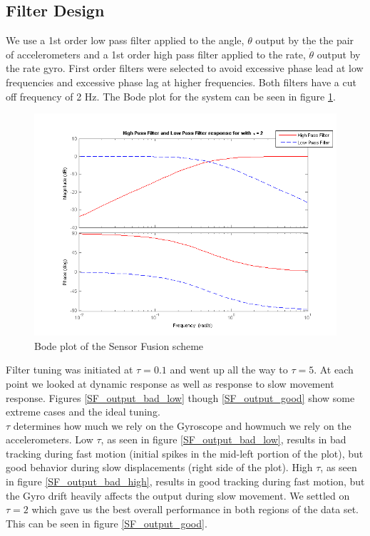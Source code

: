 \documentclass{article}
\theoremstyle{plain}
\theoremstyle{definition}
\theoremstyle{remark}
\begin{document}
\subsection{Filter Design}

We use a 1st order low pass filter applied to the angle, $\theta$ output by the the pair of accelerometers and a 1st order high pass filter applied to the rate, $\dot{\theta}$ output by the rate gyro.  First order filters were selected to avoid excessive phase lead at low frequencies and excessive phase lag at higher frequencies.  Both filters have a cut off frequency of 2 Hz. The Bode plot for the system can be seen in figure \ref{SF_bode_2}.\\

\begin{figure}[hbt]
\begin{center}
\includegraphics[width = 12cm]{SF_bode_2}
\caption{Bode plot of the Sensor Fusion scheme}
\label{SF_bode_2}
\end{center}
\end{figure}

Filter tuning was initiated at $\tau = 0.1$ and went up all the way to $\tau = 5$. At each point we looked at dynamic response as well as response to slow movement response. Figures \ref{SF_output_bad_low} though \ref{SF_output_good} show some extreme cases and the ideal tuning.\\

$\tau$ determines how much we rely on the Gyroscope and howmuch we rely on the accelerometers. Low $\tau$, as seen in figure \ref{SF_output_bad_low}, results in bad tracking during fast motion (initial spikes in the mid-left portion of the plot), but good behavior during slow displacements (right side of the plot).  High $\tau$, as seen in figure \ref{SF_output_bad_high}, results in good tracking during fast motion, but the Gyro drift heavily affects the output during slow movement. We settled on $\tau = 2$ which gave us the best overall performance in both regions of the data set. This can be seen in figure \ref{SF_output_good}.
\end{document}
